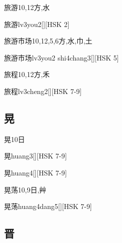 \begin{Entry}{旅游}{10,12}{⽅,⽔}
  \begin{Phonetics}{旅游}{lv3you2}[][HSK 2]
  \end{Phonetics}
\end{Entry}

\begin{Entry}{旅游市场}{10,12,5,6}{⽅,⽔,⼱,⼟}
  \begin{Phonetics}{旅游市场}{lv3you2 shi4chang3}[][HSK 5]
  \end{Phonetics}
\end{Entry}

\begin{Entry}{旅程}{10,12}{⽅,⽲}
  \begin{Phonetics}{旅程}{lv3cheng2}[][HSK 7-9]
  \end{Phonetics}
\end{Entry}

\subsection*{晃}

\begin{Entry}{晃}{10}{⽇}
  \begin{Phonetics}{晃}{huang3}[][HSK 7-9]
  \end{Phonetics}
  \begin{Phonetics}{晃}{huang4}[][HSK 7-9]
  \end{Phonetics}
\end{Entry}

\begin{Entry}{晃荡}{10,9}{⽇,⾋}
  \begin{Phonetics}{晃荡}{huang4dang5}[][HSK 7-9]
  \end{Phonetics}
\end{Entry}

\subsection*{晋}

